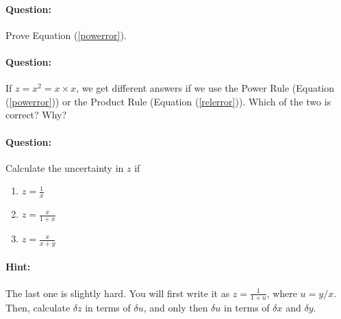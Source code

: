 \begin{question}
\paragraph{Question:} Prove Equation (\ref{powerror}).~\\

\paragraph{Question:} If $z = x^2 = x \times x$, we get different answers if we use the Power Rule (Equation (\ref{powerror})) or the Product Rule (Equation (\ref{relerror})). Which of the two is correct? Why? ~\\

\paragraph{Question:} Calculate the uncertainty in $z$ if
\begin{enumerate}
    \item $z = \frac{1}{x}$
    \item $z = \frac{x}{1+x}$
    \item $z = \frac{x}{x+y}$
\end{enumerate}
\paragraph{Hint:} The last one is slightly hard. You will first write it as $z = \frac{1}{1 + u}$, where $u = y/x$. Then, calculate $\delta z$ in terms of $\delta u$, and only then $\delta u$ in terms of $\delta x$ and $\delta y$.
\end{question}
